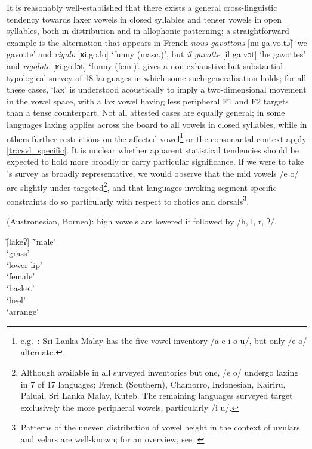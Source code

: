 It is reasonably well-established that there exists a general cross-linguistic tendency towards laxer vowels in closed syllables and tenser vowels in open syllables, both in distribution and in allophonic patterning; a straightforward example is the alternation that appears in French \emph{nous gavottons} [nu ɡa.vo.tɔ̃] `we gavotte' and \emph{rigolo} [ʁi.go.lo] `funny (masc.)', but \emph{il gavotte} [il ga.vɔt] `he gavottes' and \emph{rigolote} [ʁi.go.lɔt] `funny (fem.)'. \citet[p.~223–226]{Storme2017PhD} gives a non-exhaustive but substantial typological survey of 18 languages in which some such generalisation holds; for all these cases, `lax' is understood acoustically to imply a two-dimensional movement in the vowel space, with a lax vowel having less peripheral F1 and F2 targets than a tense counterpart. Not all attested cases are equally general; in some languages laxing applies across the board to all vowels in closed syllables, while in others further restrictions on the affected vowel\footnote{e.g.~\citet{Nordhoff2009}: Sri Lanka Malay has the five-vowel inventory /a e i o u/, but only /e o/ alternate.} or the consonantal context apply \cref{tr:csvl_specific}. It is unclear whether apparent statistical tendencies should be expected to hold more broadly or carry particular significance. If we were to take \citeauthor{Storme2017PhD}'s survey as broadly representative, we would observe that the mid vowels /e o/ are slightly under-targeted\footnote{Although available in all surveyed inventories but one, /e o/ undergo laxing in 7 of 17 languages; French (Southern), Chamorro, Indonesian, Kairiru, Paluai, Sri Lanka Malay, Kuteb. The remaining languages surveyed target exclusively the more peripheral vowels, particularly /i u/.}, and that languages invoking segment-specific constraints do so particularly with respect to rhotics and dorsals\footnote{Patterns of the uneven distribution of vowel height in the context of uvulars and velars are well-known; for an overview, see \citet[p.~103]{Gallagher2016}.}.

\clearpage
\begin{example} \label{tr:csvl_specific}
   (Austronesian, Borneo): high vowels are lowered if followed by /h, l, r, ʔ/. \citep[p.~263]{Blust2013}
  \begin{tabbing}
   \tab[2cm] \= [lakeʔ] \tab[2cm] \= `male'\\
   \> [uroʔ] \> `grass'\\
    \> `lower lip'\\
   \> [doh] \> `female'\\
    \> `basket'\\
    \> `heel'\\
    \> `arrange'
    \end{tabbing}
\end{example}

